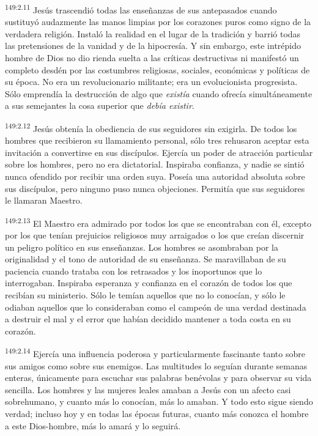 \par 
\textsuperscript{149:2.11} Jesús trascendió todas las enseñanzas de sus antepasados cuando sustituyó audazmente las manos limpias por los corazones puros como signo de la verdadera religión. Instaló la realidad en el lugar de la tradición y barrió todas las pretensiones de la vanidad y de la hipocresía. Y sin embargo, este intrépido hombre de Dios no dio rienda suelta a las críticas destructivas ni manifestó un completo desdén por las costumbres religiosas, sociales, económicas y políticas de su época. No era un revolucionario militante; era un evolucionista progresista. Sólo emprendía la destrucción de algo que \textit{existía} cuando ofrecía simultáneamente a sus semejantes la cosa superior que \textit{debía existir}.

\par 
\textsuperscript{149:2.12} Jesús obtenía la obediencia de sus seguidores sin exigirla. De todos los hombres que recibieron su llamamiento personal, sólo tres rehusaron aceptar esta invitación a convertirse en sus discípulos. Ejercía un poder de atracción particular sobre los hombres, pero no era dictatorial. Inspiraba confianza, y nadie se sintió nunca ofendido por recibir una orden suya. Poseía una autoridad absoluta sobre sus discípulos, pero ninguno puso nunca objeciones. Permitía que sus seguidores le llamaran Maestro.

\par 
\textsuperscript{149:2.13} El Maestro era admirado por todos los que se encontraban con él, excepto por los que tenían prejuicios religiosos muy arraigados o los que creían discernir un peligro político en sus enseñanzas. Los hombres se asombraban por la originalidad y el tono de autoridad de su enseñanza. Se maravillaban de su paciencia cuando trataba con los retrasados y los inoportunos que lo interrogaban. Inspiraba esperanza y confianza en el corazón de todos los que recibían su ministerio. Sólo le temían aquellos que no lo conocían, y sólo le odiaban aquellos que lo consideraban como el campeón de una verdad destinada a destruir el mal y el error que habían decidido mantener a toda costa en su corazón.

\par 
\textsuperscript{149:2.14} Ejercía una influencia poderosa y particularmente fascinante tanto sobre sus amigos como sobre sus enemigos. Las multitudes lo seguían durante semanas enteras, únicamente para escuchar sus palabras benévolas y para observar su vida sencilla. Los hombres y las mujeres leales amaban a Jesús con un afecto casi sobrehumano, y cuanto más lo conocían, más lo amaban. Y todo esto sigue siendo verdad; incluso hoy y en todas las épocas futuras, cuanto más conozca el hombre a este Dios-hombre, más lo amará y lo seguirá.

